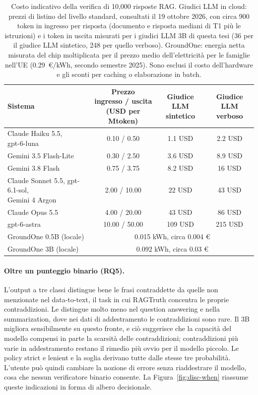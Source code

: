 \begin{table}[htbp]
\centering
\caption{Costo indicativo della verifica di 10{,}000 risposte RAG. Giudici LLM in cloud: prezzi di listino del livello
standard, consultati il 19 ottobre 2026, con circa 900 token in ingresso per risposta (documento e risposta mediani di T1
più le istruzioni) e i token in uscita misurati per i giudici LLM 3B di questa tesi (36 per il giudice LLM sintetico, 248 per
quello verboso). GroundOne: energia netta misurata del chip moltiplicata per il prezzo medio dell'elettricità per le
famiglie nell'UE (0.29~€/kWh, secondo semestre 2025). Sono esclusi il costo dell'hardware e gli sconti per caching o
elaborazione in batch.}
\label{tab:disc-cost}
\small
\begin{tabular}{lccc}
\toprule
Sistema & \makecell{Prezzo\\ingresso / uscita\\(USD per Mtoken)} & \makecell{Giudice LLM\\sintetico} & \makecell{Giudice LLM\\verboso} \\
\midrule
\makecell[l]{Claude Haiku 5.5,\\gpt-6-luna} & 0.10 / 0.50 & 1.1 USD & 2.2 USD \\
Gemini 3.5 Flash-Lite & 0.30 / 2.50 & 3.6 USD & 8.9 USD \\
Gemini 3.8 Flash & 0.75 / 3.75 & 8.2 USD & 16 USD \\
\makecell[l]{Claude Sonnet 5.5, gpt-6.1-sol,\\Gemini 4 Argon} & 2.00 / 10.00 & 22 USD & 43 USD \\
Claude Opus 5.5 & 4.00 / 20.00 & 43 USD & 86 USD \\
gpt-6-astra & 10.00 / 50.00 & 109 USD & 215 USD \\
\midrule
GroundOne 0.5B (locale) & \multicolumn{3}{c}{0.015 kWh, circa 0.004 €} \\
GroundOne 3B (locale) & \multicolumn{3}{c}{0.092 kWh, circa 0.03 €} \\
\bottomrule
\end{tabular}
\end{table}

\paragraph{Oltre un punteggio binario (RQ5).} L'output a tre classi distingue bene le frasi contraddette da quelle non
menzionate nel data-to-text, il task in cui RAGTruth concentra le proprie contraddizioni. Le distingue molto meno nel
question answering e nella summarization, dove nei dati di addestramento le contraddizioni sono rare. Il 3B migliora
sensibilmente su questo fronte, e ciò suggerisce che la capacità del modello compensi in parte la scarsità delle contraddizioni; contraddizioni più varie in addestramento restano il rimedio più ovvio per il modello piccolo. Le policy strict e lenient e la soglia derivano tutte dalle stesse tre
probabilità. L'utente può quindi cambiare la nozione di errore senza riaddestrare il modello, cosa che nessun
verificatore binario consente. La Figura~\ref{fig:disc-when} riassume queste indicazioni in forma di albero decisionale.

